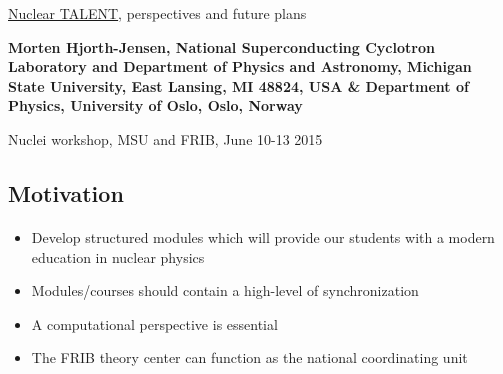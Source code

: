 \documentclass[%
twoside,                 %
final,                   %
10pt]{article}
\begin{document}






\thispagestyle{empty}

\begin{center}
{\LARGE\bf
\begin{spacing}{1.25}
\href{{http://www.nucleartalent.org}}{Nuclear TALENT}, perspectives and future plans
\end{spacing}
}
\end{center}


\begin{center}
{\bf Morten Hjorth-Jensen, National Superconducting Cyclotron Laboratory and Department of Physics and Astronomy, Michigan State University, East Lansing, MI 48824, USA {\&} Department of Physics, University of Oslo, Oslo, Norway${}^{}$} \\ [0mm]
\end{center}

    \begin{center}
\end{center}
    

\begin{center} %
Nuclei workshop, MSU and FRIB, June 10-13 2015
\end{center}

\vspace{1cm}


\subsection{Motivation}

\paragraph{}
\begin{itemize}
\item Develop structured modules which will provide our students with a modern education in nuclear physics

\item Modules/courses should contain a high-level of synchronization

\item A computational perspective is essential

\item The FRIB theory center can function as the national coordinating unit
\end{itemize}
\end{document}
